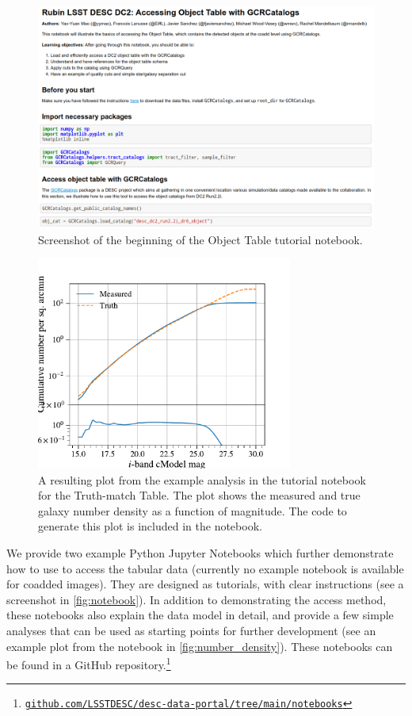 \documentclass[modern]{descnote}
\newcommand*{\https}[1]{\href{https://#1}{\nolinkurl{#1}}}
\begin{document}
\begin{figure}[tbh!]
    \centering
    \includegraphics[width=\textwidth]{figs/notebook.png}
    \caption{Screenshot of the beginning of the Object Table tutorial notebook.}
    \label{fig:notebook}
\end{figure}
\begin{figure}[tbh!]
    \centering
    \includegraphics[width=0.75\textwidth]{figs/number_density.pdf}
    \caption{A resulting plot from the example analysis in the tutorial notebook for the Truth-match Table. The plot shows the measured and true galaxy number density as a function of magnitude. The code to generate this plot is included in the notebook.}
    \label{fig:number_density}
\end{figure}

We provide two example Python Jupyter Notebooks which further demonstrate how to use  to access the tabular data 
(currently no example notebook is available for coadded images).
They are designed as tutorials, with clear instructions (see a screenshot in \autoref{fig:notebook}). In addition to demonstrating the access method, these notebooks also explain the data model in detail, and provide a few simple analyses that can be used as starting points for further development (see an example plot from the notebook in \autoref{fig:number_density}).
These notebooks can be found in a GitHub repository.\footnote{\https{github.com/LSSTDESC/desc-data-portal/tree/main/notebooks}}
\end{document}
